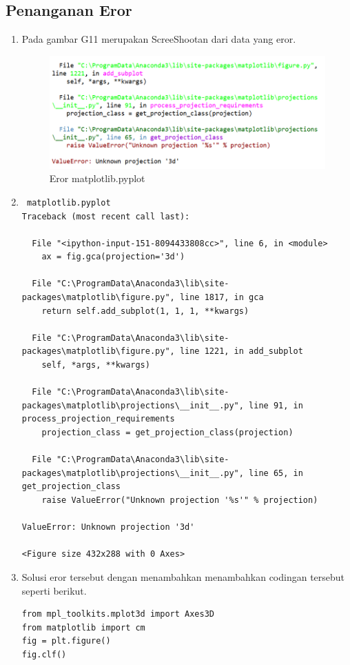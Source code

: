 \subsection{Penanganan Eror}
\begin{enumerate}
\item Pada gambar G11 merupakan ScreeShootan dari data yang eror.
\begin{figure}[ht]
	\centerline{\includegraphics[width=1\textwidth]{figures/andi/G11.PNG}}
	\caption{Eror matplotlib.pyplot}
	\label{Contoh Ilustrasi}
\end{figure}

\item 
\begin{verbatim}
 matplotlib.pyplot
Traceback (most recent call last):

  File "<ipython-input-151-8094433808cc>", line 6, in <module>
    ax = fig.gca(projection='3d')

  File "C:\ProgramData\Anaconda3\lib\site-packages\matplotlib\figure.py", line 1817, in gca
    return self.add_subplot(1, 1, 1, **kwargs)

  File "C:\ProgramData\Anaconda3\lib\site-packages\matplotlib\figure.py", line 1221, in add_subplot
    self, *args, **kwargs)

  File "C:\ProgramData\Anaconda3\lib\site-packages\matplotlib\projections\__init__.py", line 91, in process_projection_requirements
    projection_class = get_projection_class(projection)

  File "C:\ProgramData\Anaconda3\lib\site-packages\matplotlib\projections\__init__.py", line 65, in get_projection_class
    raise ValueError("Unknown projection '%s'" % projection)

ValueError: Unknown projection '3d'

<Figure size 432x288 with 0 Axes>
\end{verbatim}

\item Solusi eror tersebut dengan menambahkan  menambahkan codingan tersebut seperti berikut.
\begin{verbatim}
from mpl_toolkits.mplot3d import Axes3D
from matplotlib import cm
fig = plt.figure()
fig.clf()
\end{verbatim}
\end{enumerate}

